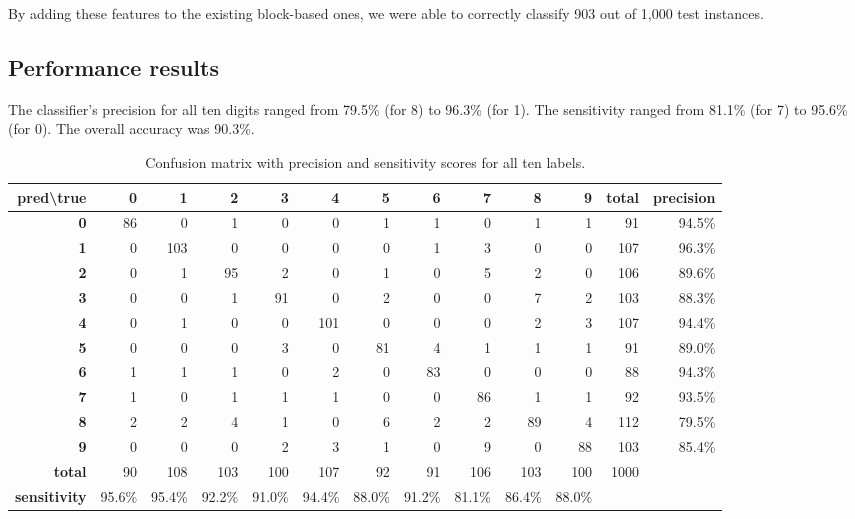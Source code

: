 \documentclass[11pt]{article}
\begin{document}
By adding these features to the existing block-based ones, we were able to correctly
classify 903 out of 1,000 test instances.

\subsection{Performance results}

The classifier's precision for all ten digits ranged from 79.5\% (for 8) to 96.3\% (for 1).
The sensitivity ranged from 81.1\% (for 7) to 95.6\% (for 0). The overall accuracy was 90.3\%.

\begin{table}[h!]
\centering
\setlength\tabcolsep{4pt}
\begin{tabular}{| r | r | r | r | r | r | r | r | r | r | r | r | r |}
\hline
\textbf{pred\textbackslash true} & \textbf{0} & \textbf{1} & \textbf{2} & \textbf{3} & \textbf{4} & \textbf{5} & \textbf{6} & \textbf{7} & \textbf{8} & \textbf{9} & \textbf{total} & \textbf{precision} \\
\hline
\textbf{0} & 86 & 0 & 1 & 0 & 0 & 1 & 1 & 0 & 1 & 1 & 91 & 94.5\% \\
\hline
\textbf{1} & 0 & 103 & 0 & 0 & 0 & 0 & 1 & 3 & 0 & 0 & 107 & 96.3\% \\
\hline
\textbf{2} & 0 & 1 & 95 & 2 & 0 & 1 & 0 & 5 & 2 & 0 & 106 & 89.6\% \\
\hline
\textbf{3} & 0 & 0 & 1 & 91 & 0 & 2 & 0 & 0 & 7 & 2 & 103 & 88.3\% \\
\hline
\textbf{4} & 0 & 1 & 0 & 0 & 101 & 0 & 0 & 0 & 2 & 3 & 107 & 94.4\% \\
\hline
\textbf{5} & 0 & 0 & 0 & 3 & 0 & 81 & 4 & 1 & 1 & 1 & 91 & 89.0\% \\
\hline
\textbf{6} & 1 & 1 & 1 & 0 & 2 & 0 & 83 & 0 & 0 & 0 & 88 & 94.3\% \\
\hline
\textbf{7} & 1 & 0 & 1 & 1 & 1 & 0 & 0 & 86 & 1 & 1 & 92 & 93.5\% \\
\hline
\textbf{8} & 2 & 2 & 4 & 1 & 0 & 6 & 2 & 2 & 89 & 4 & 112 & 79.5\% \\
\hline
\textbf{9} & 0 & 0 & 0 & 2 & 3 & 1 & 0 & 9 & 0 & 88 & 103 & 85.4\% \\
\hline
\textbf{total} & 90 & 108 & 103 & 100 & 107 & 92 & 91 & 106 & 103 & 100 & 1000 & \\
\hline
\textbf{sensitivity} & 95.6\% & 95.4\% & 92.2\% & 91.0\% & 94.4\% & 88.0\% & 91.2\% & 81.1\% & 86.4\% & 88.0\% & & \\
\hline
\end{tabular}
\caption{Confusion matrix with precision and sensitivity scores for all ten labels.}
\label{nbc_confusion_matix}
\end{table}
\end{document}
